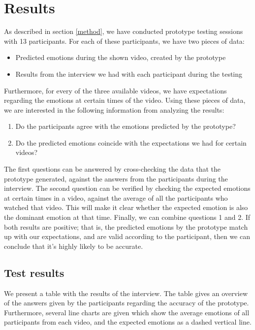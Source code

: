 \documentclass[sigconf]{acmart}
\begin{document}

\section{Results} \label{results}
As described in section \ref{method}, we have conducted prototype testing sessions with 13 participants.
For each of these participants, we have two pieces of data:
\begin{itemize}
    \item{Predicted emotions during the shown video, created by the prototype}
    \item{Results from the interview we had with each participant during the testing}
\end{itemize}
Furthermore, for every of the three available videos, we have expectations regarding the emotions at certain
times of the video. Using these pieces of data, we are interested in the following information from analyzing
the results:
\begin{enumerate}
    \item{Do the participants agree with the emotions predicted by the prototype?}
    \item{Do the predicted emotions coincide with the expectations we had for certain videos?}
\end{enumerate}
The first questions can be answered by cross-checking the data that the prototype generated, against the
answers from the participants during the interview. The second question can be verified by checking the
expected emotions at certain times in a video, against the average of all the participants who watched that
video. This will make it clear whether the expected emotion is also the dominant emotion at that time.
Finally, we can combine questions 1 and 2. If both results are positive; that is, the predicted emotions by the
prototype match up with our expectations, and are valid according to the participant, then we can conclude
that it's highly likely to be accurate.

\subsection{Test results}
We present a table with the results of the interview. The table gives an overview of the answers given by the
participants regarding the accuracy of the prototype. Furthermore, several line charts are given which show
the average emotions of all participants from each video, and the expected emotions as a dashed vertical line.
\end{document}
